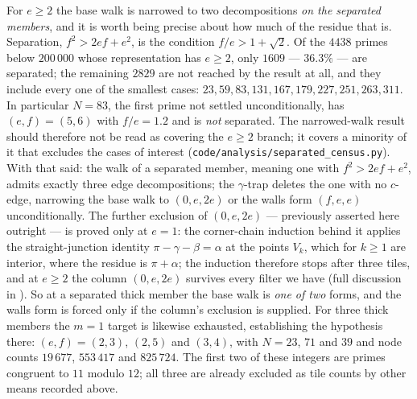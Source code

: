 \documentclass[11pt,reqno]{amsart}
\theoremstyle{plain}
\theoremstyle{definition}
\begin{document}
For $e\ge2$ the base walk is narrowed to two decompositions \emph{on the separated members}, and it
is worth being precise about how much of the residue that is. Separation, $f^2>2ef+e^2$, is the condition
$f/e>1+\sqrt2$. Of the $4438$ primes below $200\,000$ whose representation has $e\ge2$, only
$1609$ --- $36.3\%$ --- are separated; the remaining $2829$ are not reached by the result at all,
and they include every one of the smallest cases: $23, 59, 83, 131, 167, 179, 227, 251, 263, 311$.
In particular $N=83$, the first prime not settled unconditionally, has $(e,f)=(5,6)$ with
$f/e=1.2$ and is \emph{not} separated. The narrowed-walk result should therefore not be read as
covering the $e\ge2$ branch; it covers a minority of it that excludes the cases of interest
(\texttt{code/analysis/separated\_census.py}). With that said: the walk of a separated member,
meaning one with $f^2>2ef+e^2$, admits exactly three edge decompositions; the $\gamma$-trap deletes
the one with no $c$-edge, narrowing the base walk to $(0,e,2e)$ or the walls form $(f,e,e)$
unconditionally. The further exclusion of $(0,e,2e)$ --- previously asserted here outright --- is
proved only at $e=1$: the corner-chain induction behind it applies the straight-junction identity
$\pi-\gamma-\beta=\alpha$ at the points $V_k$, which for $k\ge1$ are interior, where the residue
is $\pi+\alpha$; the induction therefore stops after three tiles, and at $e\ge2$ the column
$(0,e,2e)$ survives every filter we have (full discussion in \cite{Obstructions}). So at a separated
thick member the base walk is \emph{one of two} forms, and the walls form is forced only if the
column's exclusion is supplied.
For three thick members the $m=1$ target is likewise exhausted, establishing the hypothesis
there: $(e,f)=(2,3)$, $(2,5)$ and $(3,4)$, with $N=23$, $71$ and $39$ and node counts
$19\,677$, $553\,417$ and $825\,724$. The first two of these integers are primes congruent to
$11$ modulo $12$; all three are already excluded as tile counts by other means recorded above.
\end{document}
